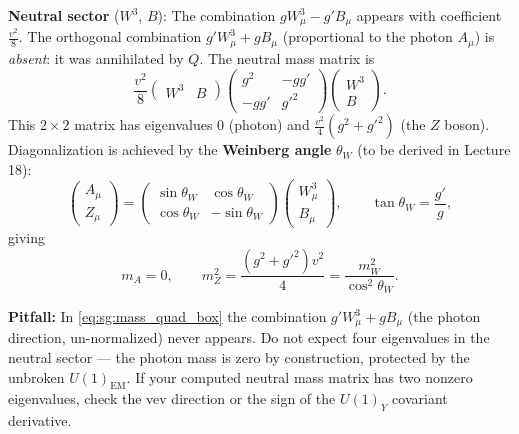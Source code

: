 \documentclass[12pt,a4paper]{article}
\newcommand{\nt}[1]{\begin{note}#1\end{note}}
\begin{document}
\textbf{Neutral sector} ($W^3$, $B$): The combination $gW^3_\mu - g'B_\mu$ appears with coefficient $\tfrac{v^2}{8}$. The orthogonal combination $g'W^3_\mu + gB_\mu$ (proportional to the photon $A_\mu$) is \emph{absent}: it was annihilated by $Q$. The neutral mass matrix is
\begin{equation}
  \frac{v^2}{8}
  \begin{pmatrix}W^3 & B\end{pmatrix}
  \begin{pmatrix}g^2 & -gg' \\ -gg' & g'^2\end{pmatrix}
  \begin{pmatrix}W^3 \\ B\end{pmatrix} .
  \label{eq:sg:neutral_mass_matrix}
\end{equation}
This $2\times2$ matrix has eigenvalues $0$ (photon) and $\tfrac{v^2}{4}(g^2+g'^2)$ (the $Z$ boson). Diagonalization is achieved by the \textbf{Weinberg angle} $\theta_W$ (to be derived in Lecture 18):
\begin{equation}
  \begin{pmatrix}A_\mu \\ Z_\mu\end{pmatrix}
  = \begin{pmatrix}\sin\theta_W & \cos\theta_W \\ \cos\theta_W & -\sin\theta_W\end{pmatrix}
    \begin{pmatrix}W^3_\mu \\ B_\mu\end{pmatrix},
  \qquad \tan\theta_W = \frac{g'}{g} ,
  \label{eq:sg:weinberg}
\end{equation}
giving
\begin{equation}
  m_A = 0 ,
  \qquad
  m_Z^2 = \frac{(g^2+g'^2)v^2}{4} = \frac{m_W^2}{\cos^2\theta_W} .
  \label{eq:sg:mZ}
\end{equation}

\nt{\textbf{Pitfall:} In \eqref{eq:sg:mass_quad_box} the combination $g'W^3_\mu + gB_\mu$ (the photon direction, un-normalized) never appears. Do not expect four eigenvalues in the neutral sector — the photon mass is zero by construction, protected by the unbroken $U(1)_{\mathrm{EM}}$. If your computed neutral mass matrix has two nonzero eigenvalues, check the vev direction or the sign of the $U(1)_Y$ covariant derivative.}

\end{document}
